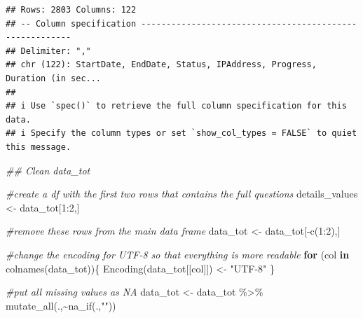 \documentclass[
]{article}
\newenvironment{Shaded}{}{}
\newcommand{\CommentTok}[1]{\textcolor[rgb]{0.38,0.63,0.69}{\textit{#1}}}
\newcommand{\ControlFlowTok}[1]{\textcolor[rgb]{0.00,0.44,0.13}{\textbf{#1}}}
\newcommand{\DecValTok}[1]{\textcolor[rgb]{0.25,0.63,0.44}{#1}}
\newcommand{\DocumentationTok}[1]{\textcolor[rgb]{0.73,0.13,0.13}{\textit{#1}}}
\newcommand{\FunctionTok}[1]{\textcolor[rgb]{0.02,0.16,0.49}{#1}}
\newcommand{\NormalTok}[1]{#1}
\newcommand{\OtherTok}[1]{\textcolor[rgb]{0.00,0.44,0.13}{#1}}
\newcommand{\SpecialCharTok}[1]{\textcolor[rgb]{0.25,0.44,0.63}{#1}}
\newcommand{\StringTok}[1]{\textcolor[rgb]{0.25,0.44,0.63}{#1}}
\begin{document}
\begin{verbatim}
## Rows: 2803 Columns: 122
## -- Column specification --------------------------------------------------------
## Delimiter: ","
## chr (122): StartDate, EndDate, Status, IPAddress, Progress, Duration (in sec...
## 
## i Use `spec()` to retrieve the full column specification for this data.
## i Specify the column types or set `show_col_types = FALSE` to quiet this message.
\end{verbatim}

\begin{Shaded}
\begin{Highlighting}[]
\DocumentationTok{\#\# Clean data\_tot}

\CommentTok{\#create a df with the first two rows that contains the full questions}
\NormalTok{details\_values }\OtherTok{\textless{}{-}}\NormalTok{ data\_tot[}\DecValTok{1}\SpecialCharTok{:}\DecValTok{2}\NormalTok{,]}


\CommentTok{\#remove these rows from the main data frame}
\NormalTok{data\_tot }\OtherTok{\textless{}{-}}\NormalTok{ data\_tot[}\SpecialCharTok{{-}}\FunctionTok{c}\NormalTok{(}\DecValTok{1}\SpecialCharTok{:}\DecValTok{2}\NormalTok{),]}


\CommentTok{\#change the encoding for UTF{-}8 so that everything is more readable}
\ControlFlowTok{for}\NormalTok{ (col }\ControlFlowTok{in} \FunctionTok{colnames}\NormalTok{(data\_tot))\{}
  \FunctionTok{Encoding}\NormalTok{(data\_tot[[col]]) }\OtherTok{\textless{}{-}} \StringTok{"UTF{-}8"}
\NormalTok{\}}

\CommentTok{\#put all missing values as NA}
\NormalTok{data\_tot }\OtherTok{\textless{}{-}}\NormalTok{ data\_tot }\SpecialCharTok{\%\textgreater{}\%} \FunctionTok{mutate\_all}\NormalTok{(.,}\SpecialCharTok{\textasciitilde{}}\FunctionTok{na\_if}\NormalTok{(.,}\StringTok{""}\NormalTok{))}



\end{Highlighting}
\end{Shaded}
\end{document}
